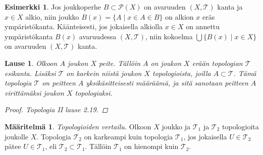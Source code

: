 \documentclass[12pt,a4paper,leqno]{report}
\newcommand{\T}{\mathcal{T}}
\newcommand{\Pot}{\mathcal{P}}
\theoremstyle{plain}
\newtheorem{lause}[equation]{Lause}
\theoremstyle{definition}
\newtheorem{maar}[equation]{Määritelmä}
\newtheorem{esim}[equation]{Esimerkki}
\theoremstyle{remark}
\begin{document}
\begin{esim}
Jos joukkoperhe $B\subset\Pot(X)$ on avaruuden $(X,\T)$ kanta ja 
$x\in X$ alkio, niin joukko 
$B(x)=\{A\mid x\in A\in B\}$ on alkion $x$ eräs ympäristökanta.
Käänteisesti, jos jokaisella alkiolla $x\in X$ on annettu ympäristökanta 
$B(x)$ avaruudessa $(X,\T)$, niin kokoelma $\bigcup\{B(x)\mid x\in X\}$ 
on avaruuden $(X,\T)$ kanta.
\end{esim}
\begin{lause}
Olkoon $A$ joukon $X$ peite. Tällöin $A$ on joukon $X$ erään topologian $\T$ esikanta. 
Lisäksi $\T$ on karkein niistä joukon $X$ topologioista, joilla $A\subset\T$. 
Tämä topologia $\T$ on peitteen $A$ yksikäsitteisesti määräämä, ja sitä sanotaan peitteen $A$ virittämäksi joukon $X$ topologiaksi.
\begin{proof}
Topologia II \cite{Topo2} lause 2.19.
\end{proof}
\end{lause}
\begin{maar}
\emph{Topologioiden vertailu.}
Olkoon $X$ joukko ja $\T_1$ ja $\T_2$ topologioita joukolle $X$.
Topologia $\T_2$ on karkeampi kuin topologia $\T_1$, 
jos jokaisella $ U\in\T_2$ pätee $ U\in\T_1$, eli $ \T_2\subset\T_1$. 
Tällöin $\T_1$ on hienompi kuin $\T_2$.
\end{maar}
\end{document}
